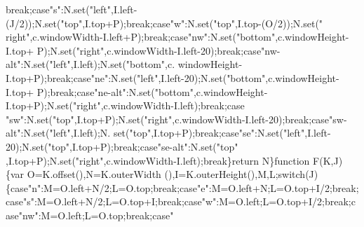 \begin{DoxyCode}
{{      break};\textcolor{keywordflow}{case}\textcolor{stringliteral}{"s"}:N.set(\textcolor{stringliteral}{"left"},I.left-(J/2));N.set(\textcolor{stringliteral}{"top"},I.top+P);\textcolor{keywordflow}{break};\textcolor{keywordflow}{case}\textcolor{stringliteral}{"w"}:N.set(\textcolor{stringliteral}{"top"},I.top-(O/2));N.set(\textcolor{stringliteral}{"
      right"},c.windowWidth-I.left+P);\textcolor{keywordflow}{break};\textcolor{keywordflow}{case}\textcolor{stringliteral}{"nw"}:N.set(\textcolor{stringliteral}{"bottom"},c.windowHeight-I.top+
      P);N.set(\textcolor{stringliteral}{"right"},c.windowWidth-I.left-20);\textcolor{keywordflow}{break};\textcolor{keywordflow}{case}\textcolor{stringliteral}{"nw-alt"}:N.set(\textcolor{stringliteral}{"left"},I.left);N.set(\textcolor{stringliteral}{"bottom"},c.
      windowHeight-I.top+P);\textcolor{keywordflow}{break};\textcolor{keywordflow}{case}\textcolor{stringliteral}{"ne"}:N.set(\textcolor{stringliteral}{"left"},I.left-20);N.set(\textcolor{stringliteral}{"bottom"},c.windowHeight-I.top+
      P);\textcolor{keywordflow}{break};\textcolor{keywordflow}{case}\textcolor{stringliteral}{"ne-alt"}:N.set(\textcolor{stringliteral}{"bottom"},c.windowHeight-I.top+P);N.set(\textcolor{stringliteral}{"right"},c.windowWidth-I.left);\textcolor{keywordflow}{break};\textcolor{keywordflow}{case}\textcolor{stringliteral}{
      "sw"}:N.set(\textcolor{stringliteral}{"top"},I.top+P);N.set(\textcolor{stringliteral}{"right"},c.windowWidth-I.left-20);\textcolor{keywordflow}{break};\textcolor{keywordflow}{case}\textcolor{stringliteral}{"sw-alt"}:N.set(\textcolor{stringliteral}{"left"},I.left);N.
      set(\textcolor{stringliteral}{"top"},I.top+P);\textcolor{keywordflow}{break};\textcolor{keywordflow}{case}\textcolor{stringliteral}{"se"}:N.set(\textcolor{stringliteral}{"left"},I.left-20);N.set(\textcolor{stringliteral}{"top"},I.top+P);\textcolor{keywordflow}{break};\textcolor{keywordflow}{case}\textcolor{stringliteral}{"se-alt"}:N.set(\textcolor{stringliteral}{"top"}
      ,I.top+P);N.set(\textcolor{stringliteral}{"right"},c.windowWidth-I.left);\textcolor{keywordflow}{break}\}\textcolor{keywordflow}{return} N\}\textcolor{keyword}{function} F(K,J)\{var O=K.offset(),N=K.outerWidth
      (),I=K.outerHeight(),M,L;\textcolor{keywordflow}{switch}(J)\{\textcolor{keywordflow}{case}\textcolor{stringliteral}{"n"}:M=O.left+N/2;L=O.top;\textcolor{keywordflow}{break};\textcolor{keywordflow}{case}\textcolor{stringliteral}{"e"}:M=O.left+N;L=O.top+I/2;\textcolor{keywordflow}{break};\textcolor{keywordflow}{
      case}\textcolor{stringliteral}{"s"}:M=O.left+N/2;L=O.top+I;\textcolor{keywordflow}{break};\textcolor{keywordflow}{case}\textcolor{stringliteral}{"w"}:M=O.left;L=O.top+I/2;\textcolor{keywordflow}{break};\textcolor{keywordflow}{case}\textcolor{stringliteral}{"nw"}:M=O.left;L=O.top;\textcolor{keywordflow}{break};\textcolor{keywordflow}{case}\textcolor{stringliteral}{"
}}
\end{DoxyCode}
